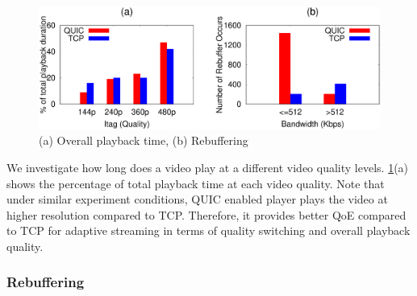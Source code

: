 \begin{figure}[!t]
	\captionsetup[subfigure]{}
	\begin{center}
        \includegraphics[width=0.9\linewidth]{img/plotdata/metric/time_duration_percent_rebuffering}
		\caption{\label{fig:bitrate_rebuffering}(a) Overall playback time,  (b) Rebuffering}
	\end{center}
\end{figure}

We investigate how long does a video play at a different video quality levels.
\fig\ref{fig:bitrate_rebuffering}(a) shows the percentage of total playback time at each video quality. 
Note that under similar experiment conditions, \ac{QUIC} enabled player plays the video at higher resolution compared to \ac{TCP}. Therefore, it provides better \ac{QoE} compared to \ac{TCP} for adaptive streaming in terms of quality switching and overall playback quality. 



\subsubsection{Rebuffering}

